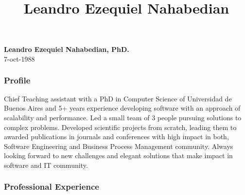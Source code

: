 \documentclass[10pt]{article}
\title{\bfseries Leandro Ezequiel Nahabedian}
\author{}
\date{}
\begin{document}
\begin{center}
{\large \textbf{Leandro Ezequiel Nahabedian, PhD.}}\\
7-oct-1988

\end{center}

\subsubsection*{Profile}
\small

Chief Teaching assistant with a PhD in Computer Science of Universidad de 
Buenos Aires and 5+ 
years experience developing software with an approach of scalability and 
performance. Led a small team of 3 people pursuing solutions to complex 
problems. Developed scientific projects from scratch, leading them to 
awarded publications in journals and conferences with high impact in both, 
Software Engineering and Business Process Management community.
Always looking forward to new challenges and elegant solutions that make impact 
in software and IT community.


\subsubsection*{Professional Experience}
\end{document}
